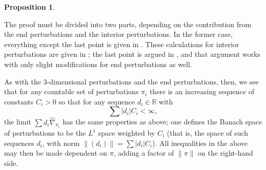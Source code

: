 \documentclass[10pt,a4paper]{amsart}
\newtheorem{proposition}[theorem]{Proposition}
\theoremstyle{definition}
\theoremstyle{remark}
\numberwithin{figure}{qchap}
\begin{document}
\begin{proposition}
\begin{enumerate}
\end{enumerate}
\end{proposition}

The proof must be divided into two parts, depending on the contribution from the end perturbations and the interior perturbations. In the former case, everything except the last point is given in \cite[Proposition~3.7]{KM1}. These calculations for interior perturbations are given in \cite[Section 3]{Kronheimer}; the last point is argued in \cite[Lemma~3.4]{Kronheimer}, and that argument works with only slight modifications for end perturbations as well.

As with the 3-dimensional perturbations and the end perturbations, then, we see that for any countable set of perturbations $\pi_i$ there is an increasing sequence of constants $C_i > 0$ so that for any sequence $d_i \in \mathbb R$ with $$\sum |d_i| C_i < \infty,$$ the limit $\sum d_i \widehat{\nabla}_{\pi_i}$ has the same properties as above; one defines the Banach space of perturbations to be the $L^1$ space weighted by $C_i$ (that is, the space of such sequences $d_i$, with norm $\|(d_i)\| = \sum |d_i| C_i$). All inequalities in the above may then be made dependent on $\pi$, adding a factor of $\|\pi\|$ on the right-hand side. 
\end{document}
